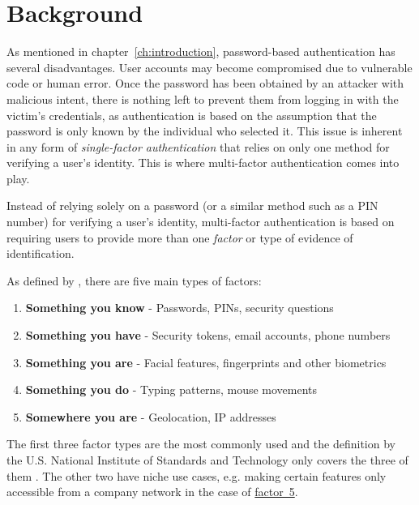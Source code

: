 \chapter{Background\label{ch:background}}

As mentioned in chapter~\ref{ch:introduction}, password-based authentication has several disadvantages. User accounts may become compromised due to vulnerable code or human error. Once the password has been obtained by an attacker with malicious intent, there is nothing left to prevent them from logging in with the victim's credentials, as authentication is based on the assumption that the password is only known by the individual who selected it. This issue is inherent in any form of \textit{single-factor authentication} \citep[54]{fenton_digital_2017} that relies on only one method for verifying a user's identity. This is where multi-factor authentication comes into play.

Instead of relying solely on a password (or a similar method such as a PIN number) for verifying a user's identity, multi-factor authentication is based on requiring users to provide more than one \textit{factor} or type of evidence of identification.

As defined by \citet{owasp_multifactor_2024}, there are five main types of factors:

\begin{enumerate}
    \item \textbf{Something you know\label{itm:factor1}} - Passwords, PINs, security questions
    \item \textbf{Something you have\label{itm:factor2}} - Security tokens, email accounts, phone numbers
    \item \textbf{Something you are\label{itm:factor3}} - Facial features, fingerprints and other biometrics
    \item \textbf{Something you do\label{itm:factor4}} - Typing patterns, mouse movements
    \item \textbf{Somewhere you are\label{itm:factor5}} - Geolocation, IP addresses
\end{enumerate}

The first three factor types are the most commonly used and the definition by the U.S. National Institute of Standards and Technology only covers the three of them \citep[49]{fenton_digital_2017}. The other two have niche use cases, e.g. making certain features only accessible from a company network in the case of \hyperref[itm:factor5]{factor~5}.

